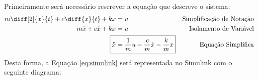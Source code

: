 \documentclass{article}
\begin{document}
            \begin{resolution}
                Primeiramente será necessário rescrever a equação que descreve o sistema:
                    \begin{align}
                        m\diff[2]{x}{t} + c\diff{x}{t} + kx &= u & \text{Simplificação de Notação\nonumber}\\
                        m\ddot{x} + c\dot{x} + kx           &= u & \text{Isolamento de Variável}\nonumber\\
                        \Aboxed{\ddot{x} &= \frac{1}{m}u - \frac{c}{m}\dot{x} - \frac{k}{m}x}   & \text{Equação Simplifica}\label{eq:simulink}
                    \end{align}
                Desta forma, a Equação \ref{eq:simulink} será representada no Simulink com o seguinte diagrama:
                    
            \end{resolution}
\end{document}
